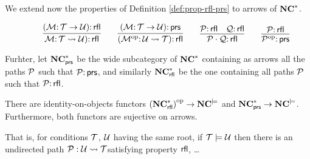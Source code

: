We extend now the properties of Definition \ref{def:prop-rfl-prs} to arrows of $\mathbf{NC}^*$.

\begin{definition}
    $$
    \qquad \infer{\cM \of \cT \leadsto \cU)\of \rfl}{(\cM \of \cT \to \cU)\of \rfl} 
    \qquad \infer{(\op{\cM} \of \cU \leadsto \cT)\of \rfl}{(\cM \of \cT \to \cU)\of \prs}
    \qquad \infer{\cP\cdot\cQ\of \rfl}{\cP\of \rfl & \cQ \of \rfl} 
    \qquad \infer{\op{\cP} \of \prs}{\cP\of \rfl} $$

Furhter, let $\mathbf{NC}^*_{{\mathsf{prs}}}$ be the wide subcategory of $\mathbf{NC}^*$ containing as arrows all the paths ${\mathcal{P}}$ such that  ${\mathcal{P}} {:}\, {\mathsf{prs}}$, and similarly $\mathbf{NC}^*_{{\mathsf{rfl}}}$ be the one containing all paths ${\mathcal{P}}$ such that  ${\mathcal{P}} {:}\, {\mathsf{rfl}}$.

\end{definition}

\begin{theorem}
    There are identity-on-objects functors  ${(\mathbf{NC}^*_{{\mathsf{rfl}}})}^{\mathrm{op}} \rightarrow \mathbf{NC}^{\models}$ and $\mathbf{NC}^*_{{\mathsf{prs}}} \rightarrow \mathbf{NC}^{\models}$. Furthermore, both functors are sujective on arrows. 

    That is, for conditions ${\mathcal{T}}$, ${\mathcal{U}}$ having the same root, if ${\mathcal{T}} \models {\mathcal{U}}$ then there is an undirected path ${\mathcal{P}}:{\mathcal{U}} \leadsto {\mathcal{T}} $satisfying property ${\mathsf{rfl}}$, \dots
\end{theorem}



